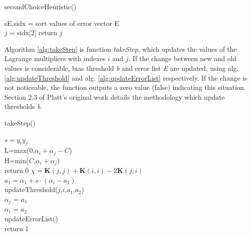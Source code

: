 \documentclass{ipol}
\def\K{{\mathbf K}}
\begin{document}
\begin{algorithm}[!htbp]
\small
\caption{secondChoiceHeuristic()}
\DontPrintSemicolon
{}
sE,sidx = sort values of error vector E \\
 {
     {$j$ = sidx[2]}
	}	
	return $j$\\
\label{alg:secondChoiceHeuristic}
\end{algorithm}

Algorithm \ref{alg:takeStep} is function \textit{takeStep}, which updates the values of the Lagrange multipliers with indexes $i$ and $j$.
If the change between new and old values is considerable, bias threshold \textit{b} and error list \textit{E} are updated, using alg. \ref{alg:updateThreshold} and alg. \ref{alg:updateErrorList} respectively.
If the change is not noticeable, the function outputs a zero value (false) indicating this situation.
Section 2.3 of Platt's original work \cite{Platt:1998} details the methodology which update thresholds \textit{b}.

\begin{algorithm}[!htbp]
\small
\caption{takeStep()}
\DontPrintSemicolon
{}
$s = y_i y_j$\\
 {
	L=max(0,$\alpha_i+\alpha_j-C$)\\
	H=min($C$,$\alpha_i+\alpha_j$)\\
	}
	{return 0}
$\chi = \K(j,j) + \K(i,i) - 2\K(j,i)$ \\

$a_1 = \alpha_1 + s \cdot (\alpha_i-a_2)$\\
updateThreshold($j$,$i$,$a_1$,$a_2$)\\
$\alpha_j$ = $a_1$\\
$\alpha_i$ = $a_2$\\
updateErrorList()\\
return 1\\
\label{alg:takeStep}
\end{algorithm}
\end{document}
